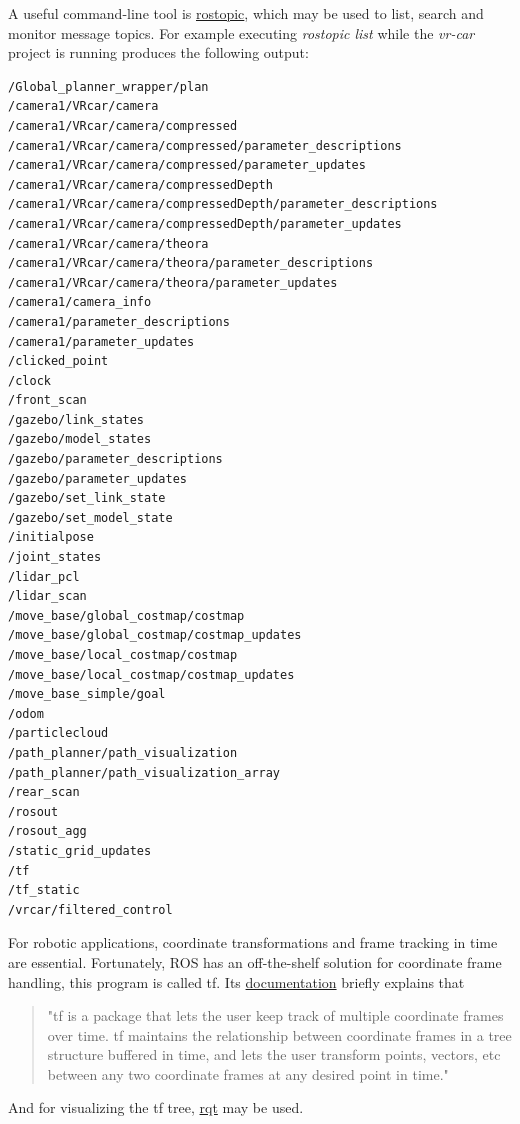 A useful command-line tool is \href{http://wiki.ros.org/rostopic}{rostopic}, which may be used to list, search and monitor message topics. For example executing \textit{rostopic list} while the \textit{vr-car} project is running produces the following output:

\begin{minipage}{\textwidth}
\begin{lstlisting}[language=bash]
/Global_planner_wrapper/plan
/camera1/VRcar/camera
/camera1/VRcar/camera/compressed
/camera1/VRcar/camera/compressed/parameter_descriptions
/camera1/VRcar/camera/compressed/parameter_updates
/camera1/VRcar/camera/compressedDepth
/camera1/VRcar/camera/compressedDepth/parameter_descriptions
/camera1/VRcar/camera/compressedDepth/parameter_updates
/camera1/VRcar/camera/theora
/camera1/VRcar/camera/theora/parameter_descriptions
/camera1/VRcar/camera/theora/parameter_updates
/camera1/camera_info
/camera1/parameter_descriptions
/camera1/parameter_updates
/clicked_point
/clock
/front_scan
/gazebo/link_states
/gazebo/model_states
/gazebo/parameter_descriptions
/gazebo/parameter_updates
/gazebo/set_link_state
/gazebo/set_model_state
/initialpose
/joint_states
/lidar_pcl
/lidar_scan
/move_base/global_costmap/costmap
/move_base/global_costmap/costmap_updates
/move_base/local_costmap/costmap
/move_base/local_costmap/costmap_updates
/move_base_simple/goal
/odom
/particlecloud
/path_planner/path_visualization
/path_planner/path_visualization_array
/rear_scan
/rosout
/rosout_agg
/static_grid_updates
/tf
/tf_static
/vrcar/filtered_control
\end{lstlisting}
\end{minipage}

For robotic applications, coordinate transformations and frame tracking in time are essential. Fortunately, ROS has an off-the-shelf solution for coordinate frame handling, this program is called tf. Its \href{http://wiki.ros.org/tf}{documentation} briefly explains that

\begin{quote}
"tf is a package that lets the user keep track of multiple coordinate frames over time. tf maintains the relationship between coordinate frames in a tree structure buffered in time, and lets the user transform points, vectors, etc between any two coordinate frames at any desired point in time."
\end{quote}

And for visualizing the tf tree, \href{http://wiki.ros.org/rqt}{rqt} may be used.

